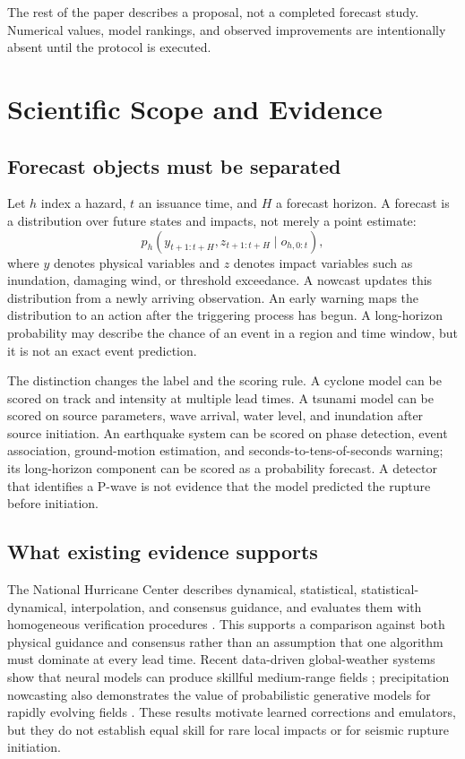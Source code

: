 \documentclass[conference]{IEEEtran}
\begin{document}
The rest of the paper describes a proposal, not a completed forecast study. Numerical values, model rankings, and observed improvements are intentionally absent until the protocol is executed.

\section{Scientific Scope and Evidence}

\subsection{Forecast objects must be separated}

Let $h$ index a hazard, $t$ an issuance time, and $H$ a forecast horizon. A forecast is a distribution over future states and impacts, not merely a point estimate:
\begin{equation}
 p_h(y_{t+1:t+H},z_{t+1:t+H}\mid o_{h,0:t}),
 \label{eq:forecast}
\end{equation}
where $y$ denotes physical variables and $z$ denotes impact variables such as inundation, damaging wind, or threshold exceedance. A nowcast updates this distribution from a newly arriving observation. An early warning maps the distribution to an action after the triggering process has begun. A long-horizon probability may describe the chance of an event in a region and time window, but it is not an exact event prediction.

The distinction changes the label and the scoring rule. A cyclone model can be scored on track and intensity at multiple lead times. A tsunami model can be scored on source parameters, wave arrival, water level, and inundation after source initiation. An earthquake system can be scored on phase detection, event association, ground-motion estimation, and seconds-to-tens-of-seconds warning; its long-horizon component can be scored as a probability forecast. A detector that identifies a P-wave is not evidence that the model predicted the rupture before initiation.

\subsection{What existing evidence supports}

The National Hurricane Center describes dynamical, statistical, statistical-dynamical, interpolation, and consensus guidance, and evaluates them with homogeneous verification procedures \cite{nhc}. This supports a comparison against both physical guidance and consensus rather than an assumption that one algorithm must dominate at every lead time. Recent data-driven global-weather systems show that neural models can produce skillful medium-range fields \cite{lam,bi}; precipitation nowcasting also demonstrates the value of probabilistic generative models for rapidly evolving fields \cite{ravuri}. These results motivate learned corrections and emulators, but they do not establish equal skill for rare local impacts or for seismic rupture initiation.
\end{document}
